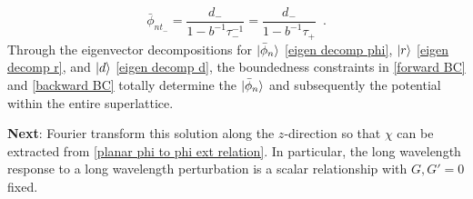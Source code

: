\documentclass{article}
\DeclarePairedDelimiter\ket{\lvert}{\rangle}
\newcommand{\note}[1]{{\bf \color{red} #1}}
\begin{document}
\begin{equation}
    \label{backward BC}
    \bar\phi_{nt_-} = \frac{d_-}{1-b^{-1}\tau_-^{-1}} = \frac{d_-}{1-b^{-1}\tau_+}
    \,\,\,.
\end{equation}
Through the eigenvector decompositions for $\ket{\bar\phi_n}$ \eqref{eigen decomp phi}, $\ket r$ \eqref{eigen decomp r}, and $\ket d$ \eqref{eigen decomp d}, the boundedness constraints in \eqref{forward BC} and \eqref{backward BC} totally determine the $\ket{\bar\phi_n}$ and subsequently the potential within the entire superlattice.

\note{Next}: Fourier transform this solution along the $z$-direction so that $\chi$ can be extracted from \eqref{planar phi to phi ext relation}.  In particular, the long wavelength response to a long wavelength perturbation is a scalar relationship with $G,G'=0$ fixed.
\end{document}
